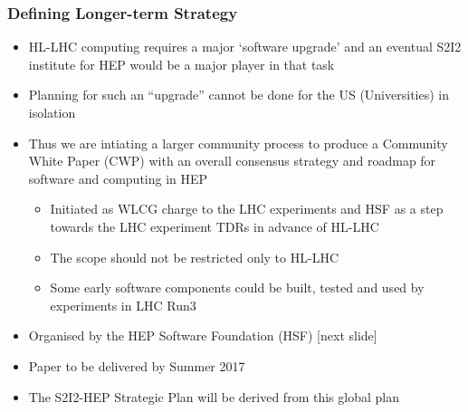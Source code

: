 \begin{frame}
\frametitle{Defining Longer-term Strategy}

\begin{itemize}
\item HL-LHC computing requires a major `software upgrade' and an eventual S2I2 institute for HEP would be a major player in that task
\item Planning for such an ``upgrade'' cannot be done for the US (Universities) in isolation
\item Thus we are intiating a larger community process to produce a Community White Paper (CWP) with an overall consensus strategy and roadmap for software and computing in HEP
  \begin{itemize}
  \item Initiated as WLCG charge to the LHC experiments and HSF as a step towards the LHC experiment TDRs in advance of HL-LHC
  \item The scope should not be restricted only to HL-LHC
  \item Some early software components could be built, tested and used by experiments in LHC Run3
  \end{itemize}
\item Organised by the HEP Software Foundation (HSF) [next slide]
\item Paper to be delivered by Summer 2017
\item The S2I2-HEP Strategic Plan will be derived from this global plan
\end{itemize}

\end{frame}


